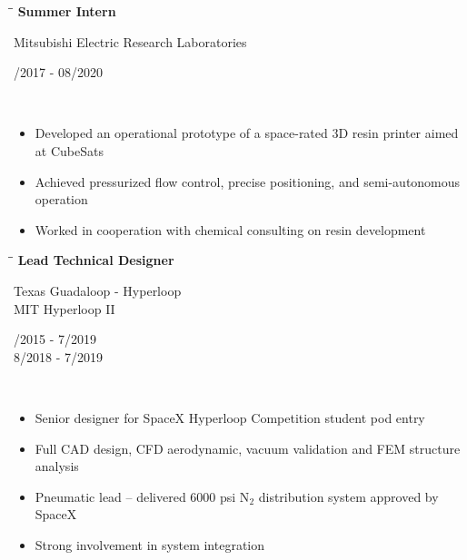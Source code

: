 \documentclass[11pt]{res}
\begin{document}
\begin{resume}
   \begin{tabbing}
   \hspace{2.3in}\= \hspace{2.7in}\= \kill %
    {\bf Summer Intern} \> \parbox[c]{6cm}{ \centering Mitsubishi Electric Research Laboratories}    \> \parbox[c]{3.3cm}{ /2017 - 08/2020} \\
   \end{tabbing}
   \vspace{-18pt}   %
    \begin{itemize}
   	  \item Developed an operational prototype of a space-rated 3D resin printer aimed at CubeSats
   	  \item Achieved pressurized flow control, precise positioning, and semi-autonomous operation
   	  \item Worked in cooperation with chemical consulting on resin development
   	\end{itemize}
\vspace{-5pt}
	
   \begin{tabbing}
   \hspace{2.3in}\= \hspace{2.7in}\= \kill %
    {\bf Lead Technical Designer} \> \parbox[c]{6cm}{ \centering Texas Guadaloop - Hyperloop \\ MIT Hyperloop II} \> \parbox[c]{3.3cm}{ /2015 - 7/2019 \\ 8/2018 - 7/2019}\\
   \end{tabbing}
   \vspace{-18pt}   %
   	\begin{itemize}
	   \item Senior designer for SpaceX Hyperloop Competition student pod entry
	   \item Full CAD design, CFD aerodynamic, vacuum validation and FEM structure analysis
	   \item Pneumatic lead {}-- delivered 6000 psi N$_2$ distribution system approved by SpaceX
	   \item Strong involvement in system integration
	\end{itemize} 
\vspace{-10pt}


\end{resume}
\end{document}
